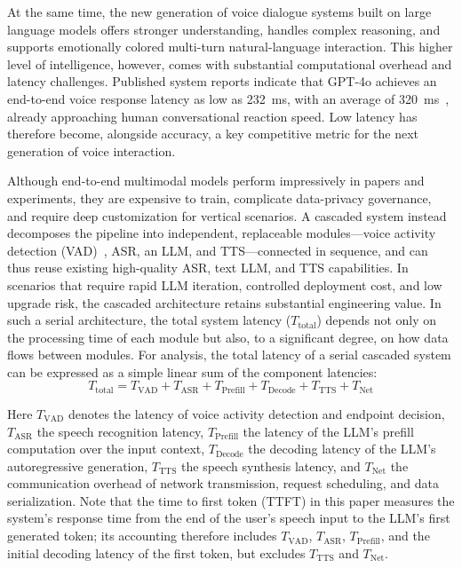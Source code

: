 \documentclass[a4paper,11pt]{article}
\begin{document}
At the same time, the new generation of voice dialogue systems built on large language models offers stronger understanding, handles complex reasoning, and supports emotionally colored multi-turn natural-language interaction. This higher level of intelligence, however, comes with substantial computational overhead and latency challenges. Published system reports indicate that GPT-4o achieves an end-to-end voice response latency as low as 232~ms, with an average of 320~ms~\cite{ref1}, already approaching human conversational reaction speed. Low latency has therefore become, alongside accuracy, a key competitive metric for the next generation of voice interaction.

Although end-to-end multimodal models perform impressively in papers and experiments, they are expensive to train, complicate data-privacy governance, and require deep customization for vertical scenarios. A cascaded system instead decomposes the pipeline into independent, replaceable modules---voice activity detection (VAD)~\cite{ref2}, ASR, an LLM, and TTS---connected in sequence, and can thus reuse existing high-quality ASR, text LLM, and TTS capabilities. In scenarios that require rapid LLM iteration, controlled deployment cost, and low upgrade risk, the cascaded architecture retains substantial engineering value. In such a serial architecture, the total system latency ($T_{\mathrm{total}}$) depends not only on the processing time of each module but also, to a significant degree, on how data flows between modules. For analysis, the total latency of a serial cascaded system can be expressed as a simple linear sum of the component latencies:
\begin{equation}
T_{\mathrm{total}} = T_{\mathrm{VAD}} + T_{\mathrm{ASR}} + T_{\mathrm{Prefill}} + T_{\mathrm{Decode}} + T_{\mathrm{TTS}} + T_{\mathrm{Net}}
\label{eq:total}
\end{equation}

Here $T_{\mathrm{VAD}}$ denotes the latency of voice activity detection and endpoint decision, $T_{\mathrm{ASR}}$ the speech recognition latency, $T_{\mathrm{Prefill}}$ the latency of the LLM's prefill computation over the input context, $T_{\mathrm{Decode}}$ the decoding latency of the LLM's autoregressive generation, $T_{\mathrm{TTS}}$ the speech synthesis latency, and $T_{\mathrm{Net}}$ the communication overhead of network transmission, request scheduling, and data serialization. Note that the time to first token (TTFT) in this paper measures the system's response time from the end of the user's speech input to the LLM's first generated token; its accounting therefore includes $T_{\mathrm{VAD}}$, $T_{\mathrm{ASR}}$, $T_{\mathrm{Prefill}}$, and the initial decoding latency of the first token, but excludes $T_{\mathrm{TTS}}$ and $T_{\mathrm{Net}}$.
\end{document}
